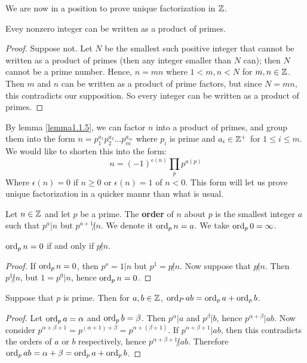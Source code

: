 We are now in a position to prove unique factorization in $\mathbb{Z}$.

\begin{lemma}\label{lemma1.1.5}
    Evey nonzero integer can be written as a product of primes.
\end{lemma}
\begin{proof}
    Suppose not. Let $N$ be the smallest such positive integer that cannot be written as a product of primes (then any integer smaller than $N$ can); then $N$ cannot be a prime number. Hence, $n=mn$ where $1<m,n<N$ for $m,n \in \mathbb{Z}$. Then $m$ and $n$ can be written as a product of prime factors, but since $N=mn$, this contradicts our supposition. So every integer can be written as a product of primes.
\end{proof}

By lemma \ref{lemma1.1.5}, we can factor $n$ into a product of primes, and group them into the form $n=p_1^{a_1}p_2^{a_2} \dots p_m^{a_m}$ where $p_i$ is prime and $a_i \in \mathbb{Z}^+$ for $1 \leq i \leq m$. We would like to shorten this into the form:
    \begin{equation*}
        n=(-1)^{\epsilon(n)} \prod_{p} p^{a(p)}
    \end{equation*}
Where $\epsilon(n)=0$ if $n \geq 0$ or $\epsilon(n)=1$ of $n<0$. This form will let us prove unique factorization in a quicker mannr than what is usual. 

\begin{definition}
    Let $n \in \mathbb{Z}$ and let $p$ be a prime. The \textbf{order} of $n$ about $p$ is the smallest integer $a$ such that $p^a|n$ but $p^{a+1} \not| n$. We denote it $\operatorname{ord}_p{n}=a$. We take $\operatorname{ord}_p{0}=\infty$.
\end{definition}

\begin{lemma}\label{lema1.1.6}
    $\operatorname{ord}_p{n}=0$ if and only if $p \not|n$.
\end{lemma}
\begin{proof}
    If $\operatorname{ord}_p{n}=0$, then $p^o=1|n$ but $p^1=p \not| n$. Now suppose that $p \not| n$. Then $p^1 \not| n$, but $1=p^0|n$, hence $\operatorname{ord}_p{n}=0$.
\end{proof}

\begin{proposition}\label{proposition1.1.7}
    Suppose that $p$ is prime. Then for $a,b \in \mathbb{Z}$, $\operatorname{ord}_P{ab}=\operatorname{ord}_p{a}+\operatorname{ord}_p{b}$. 
\end{proposition}
\begin{proof}
    Let $\operatorname{ord}_p{a}=\alpha$ and $\operatorname{ord}_p{b}=\beta$. Then $p^{\alpha}|a$ and $p^{\beta}|b$, hence $p^{\alpha+\beta}|ab$. Now consider $p^{\alpha+\beta+1}=p^{(\alpha+1)+\beta}=p^{\alpha+(\beta+1)}$. If $p^{\alpha+\beta+1}|ab$, then this contradicts the orders of $a$ or $b$ respectively, hence $p^{\alpha+\beta+1} \not| ab$. Therefore $\operatorname{ord}_p{ab}=\alpha+\beta=\operatorname{ord}_p{a}+\operatorname{ord}_p{b}$. 
\end{proof}

